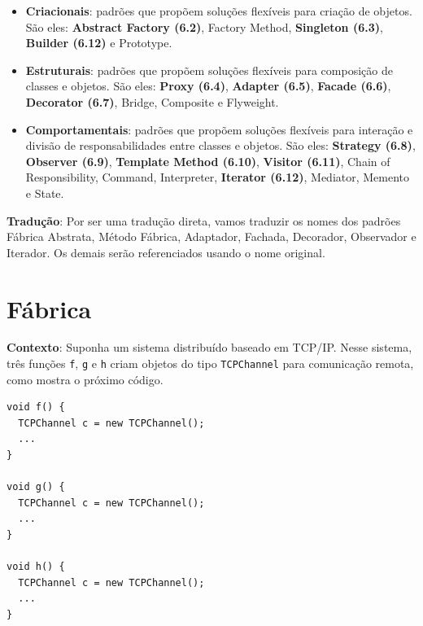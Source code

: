 \documentclass[
  11pt,
  twoside]{book}
\newcommand{\passthrough}[1]{#1}
\begin{document}
\begin{itemize}
\item
  \textbf{Criacionais}: padrões 
  que propõem soluções flexíveis para criação de objetos. São eles:
  \textbf{Abstract Factory (6.2)}, Factory Method, \textbf{Singleton
  (6.3)}, \textbf{Builder (6.12)} e Prototype.
\item
  \textbf{Estruturais}:  padrões
  que propõem soluções flexíveis para composição de classes e objetos.
  São eles: \textbf{Proxy (6.4)}, \textbf{Adapter (6.5)}, \textbf{Facade
  (6.6)}, \textbf{Decorator (6.7)}, Bridge, Composite e Flyweight.
\item
  \textbf{Comportamentais}: padrões
   que propõem soluções
  flexíveis para interação e divisão de responsabilidades entre classes
  e objetos. São eles: \textbf{Strategy (6.8)}, \textbf{Observer (6.9)},
  \textbf{Template Method (6.10)}, \textbf{Visitor (6.11)}, Chain of
  Responsibility, Command, Interpreter, \textbf{Iterator (6.12)},
  Mediator, Memento e State.
\end{itemize}

\textbf{Tradução}: Por ser uma tradução direta, vamos traduzir os nomes
dos padrões Fábrica Abstrata, Método Fábrica, Adaptador, Fachada,
Decorador, Observador e Iterador. Os demais serão referenciados usando o
nome original.

\hypertarget{fuxe1brica}{%
\section{Fábrica}\label{fuxe1brica}}

 

\textbf{Contexto}: Suponha um sistema distribuído baseado em TCP/IP.
Nesse sistema, três funções \passthrough{\lstinline!f!},
\passthrough{\lstinline!g!} e \passthrough{\lstinline!h!} criam objetos
do tipo \passthrough{\lstinline!TCPChannel!} para comunicação remota,
como mostra o próximo código.

\begin{lstlisting}
void f() {
  TCPChannel c = new TCPChannel();  
  ...
}

void g() {
  TCPChannel c = new TCPChannel();
  ...
}

void h() {
  TCPChannel c = new TCPChannel();
  ...
}
\end{lstlisting}
\end{document}
